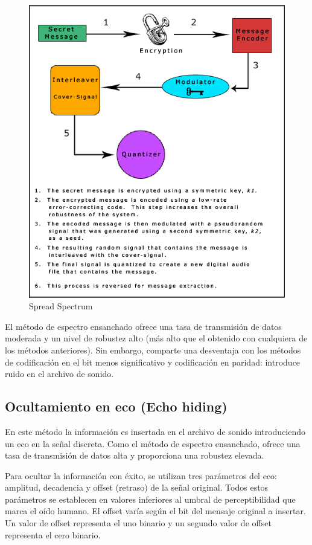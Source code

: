 \documentclass[12pt]{article}
\begin{document}
\begin{figure}
  \centering
    \includegraphics[width=\textwidth]{img/spreadspectrum}
  \caption{Spread Spectrum}
  \label{spreadspectrum}
\end{figure}

El método de espectro ensanchado ofrece una tasa de transmisión de datos moderada y un nivel de robustez alto (más alto que el obtenido con cualquiera de los métodos anteriores). Sin embargo, comparte una desventaja con los métodos de codificación en el bit menos significativo y codificación en paridad: introduce ruido en el archivo de sonido.

\subsection{Ocultamiento en eco (Echo hiding)}

En este método la información es insertada en el archivo de sonido introduciendo un eco en la señal discreta. Como el método de espectro ensanchado, ofrece una tasa de transmisión de datos alta y proporciona una robustez elevada.

Para ocultar la información con éxito, se utilizan tres parámetros del eco: amplitud, decadencia y offset (retraso) de la señal original. Todos estos parámetros se establecen en valores inferiores al umbral de perceptibilidad que marca el oído humano. El offset varía según el bit del mensaje original a insertar. Un valor de offset representa el uno binario y un segundo valor de offset representa el cero binario.
\end{document}
